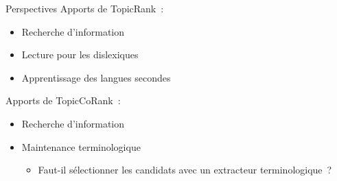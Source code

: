   \begin{frame}{Perspectives}
    Apports de TopicRank~:
    \begin{itemize}
      \item{Recherche d'information~\cite{jones1999phrasier}}
      \item{Lecture pour les dislexiques~\cite{rello2014dislexia}}
      \item{Apprentissage des langues secondes~\cite{pressley1982mnemonickeywordmethod}}
    \end{itemize}

    \vspace{1em}

    Apports de TopicCoRank~:
    \begin{itemize}
      \item{Recherche d'information~\cite{jones1999phrasier}}
      \item{Maintenance terminologique}
      \begin{itemize}
        \item{Faut-il sélectionner les candidats avec un extracteur
              terminologique~?}
      \end{itemize}
    \end{itemize}
  \end{frame}

